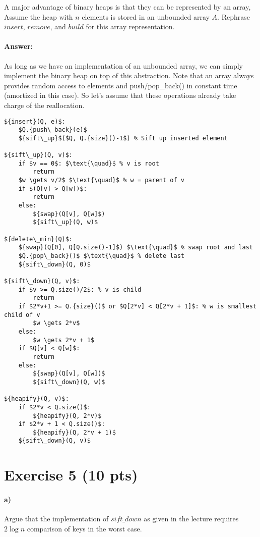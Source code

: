 \documentclass[a4paper]{article}
\begin{document}
A major advantage of binary heaps is that they can be represented by an array, Assume the heap with $n$ elements is stored in an unbounded array $A$. Rephrase ${insert}$, ${remove}$, and ${build}$ for this array representation.

\paragraph{Answer:}

As long as we have an implementation of an unbounded array, we can simply implement the binary heap on top of this abstraction. Note that an array always provides random access to elements and push/pop\_back() in constant time (amortized in this case). So let's assume that these operations already take charge of the reallocation.

\begin{lstlisting}[mathescape]
${insert}(Q, e)$:
    $Q.{push\_back}(e)$
    ${sift\_up}$($Q, Q.{size}()-1$) % Sift up inserted element
    
${sift\_up}(Q, v)$:
    if $v == 0$: $\text{\quad}$ % v is root
        return
    $w \gets v/2$ $\text{\quad}$ % w = parent of v
    if $(Q[v] > Q[w])$:
        return
    else:
        ${swap}(Q[v], Q[w]$)
        ${sift\_up}(Q, w)$

${delete\_min}(Q)$:
    ${swap}(Q[0], Q[Q.size()-1]$) $\text{\quad}$ % swap root and last
    $Q.{pop\_back}()$ $\text{\quad}$ % delete last
    ${sift\_down}(Q, 0)$

${sift\_down}(Q, v)$:
    if $v >= Q.size()/2$: % v is child
        return
    if $2*v+1 >= Q.{size}()$ or $Q[2*v] < Q[2*v + 1]$: % w is smallest child of v
        $w \gets 2*v$
    else:
        $w \gets 2*v + 1$
    if $Q[v] < Q[w]$:
        return
    else:
        ${swap}(Q[v], Q[w])$
        ${sift\_down}(Q, w)$

${heapify}(Q, v)$:
    if $2*v < Q.size()$:
        ${heapify}(Q, 2*v)$
    if $2*v + 1 < Q.size()$:
        ${heapify}(Q, 2*v + 1)$
    ${sift\_down}(Q, v)$
\end{lstlisting}

\section{Exercise 5 (10 pts)}

\paragraph{a) } Argue that the implementation of ${sift\_down}$ as given in the lecture requires $2 \log n$ comparison of keys in the worst case.
\end{document}

